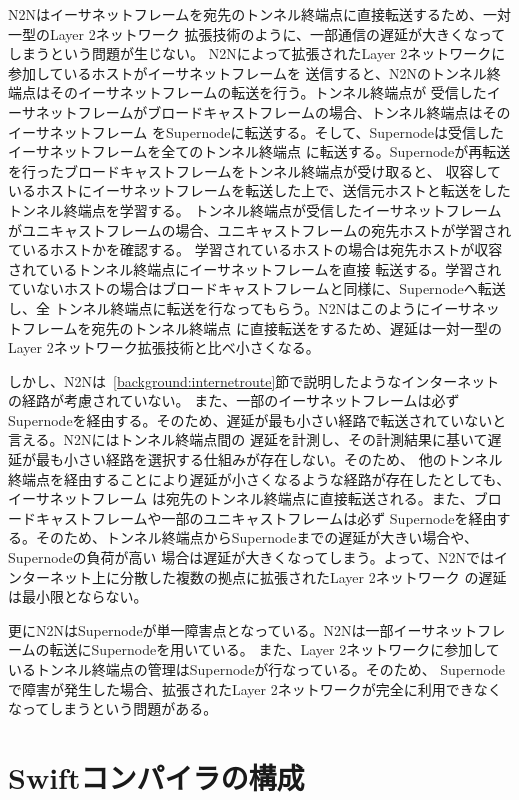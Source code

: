 N2Nはイーサネットフレームを宛先のトンネル終端点に直接転送するため、一対一型のLayer 2ネットワーク
拡張技術のように、一部通信の遅延が大きくなってしまうという問題が生じない。
N2Nによって拡張されたLayer 2ネットワークに参加しているホストがイーサネットフレームを
送信すると、N2Nのトンネル終端点はそのイーサネットフレームの転送を行う。トンネル終端点が
受信したイーサネットフレームがブロードキャストフレームの場合、トンネル終端点はそのイーサネットフレーム
をSupernodeに転送する。そして、Supernodeは受信したイーサネットフレームを全てのトンネル終端点
に転送する。Supernodeが再転送を行ったブロードキャストフレームをトンネル終端点が受け取ると、
収容しているホストにイーサネットフレームを転送した上で、送信元ホストと転送をしたトンネル終端点を学習する。
トンネル終端点が受信したイーサネットフレーム
がユニキャストフレームの場合、ユニキャストフレームの宛先ホストが学習されているホストかを確認する。
学習されているホストの場合は宛先ホストが収容されているトンネル終端点にイーサネットフレームを直接
転送する。学習されていないホストの場合はブロードキャストフレームと同様に、Supernodeへ転送し、全
トンネル終端点に転送を行なってもらう。N2Nはこのようにイーサネットフレームを宛先のトンネル終端点
に直接転送をするため、遅延は一対一型のLayer 2ネットワーク拡張技術と比べ小さくなる。

しかし、N2Nは~\ref{background:internetroute}節で説明したようなインターネットの経路が考慮されていない。
また、一部のイーサネットフレームは必ずSupernodeを経由する。そのため、遅延が最も小さい経路で転送されていないと言える。N2Nにはトンネル終端点間の
遅延を計測し、その計測結果に基いて遅延が最も小さい経路を選択する仕組みが存在しない。そのため、
他のトンネル終端点を経由することにより遅延が小さくなるような経路が存在したとしても、イーサネットフレーム
は宛先のトンネル終端点に直接転送される。また、ブロードキャストフレームや一部のユニキャストフレームは必ず
Supernodeを経由する。そのため、トンネル終端点からSupernodeまでの遅延が大きい場合や、Supernodeの負荷が高い
場合は遅延が大きくなってしまう。よって、N2Nではインターネット上に分散した複数の拠点に拡張されたLayer 2ネットワーク
の遅延は最小限とならない。

更にN2NはSupernodeが単一障害点となっている。N2Nは一部イーサネットフレームの転送にSupernodeを用いている。
また、Layer 2ネットワークに参加しているトンネル終端点の管理はSupernodeが行なっている。そのため、
Supernodeで障害が発生した場合、拡張されたLayer 2ネットワークが完全に利用できなくなってしまうという問題がある。

\section{Swiftコンパイラの構成}
\label{background:korekara}

